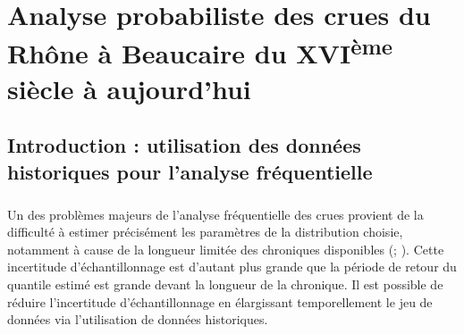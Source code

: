 % 
%
%
%
%

\chapter{Analyse probabiliste des crues du Rhône à Beaucaire du XVI\textsuperscript{ème} siècle à aujourd'hui}
\label{chap:ch4}

\newpage

\section{Introduction : utilisation des données historiques pour l'analyse fréquentielle}

	\paragraph{} Un des problèmes majeurs de l'analyse fréquentielle des crues provient de la difficulté à estimer précisément les paramètres de la distribution choisie, notamment à cause de la longueur limitée des chroniques disponibles (\cite{kjeldsen_uncertainty_2011}; \cite{apel_flood_2004}). Cette incertitude d'échantillonnage est d'autant plus grande que la période de retour du quantile estimé est grande devant la longueur de la chronique. Il est possible de réduire l'incertitude d'échantillonnage en élargissant temporellement le jeu de données via l'utilisation de données historiques.
	 
